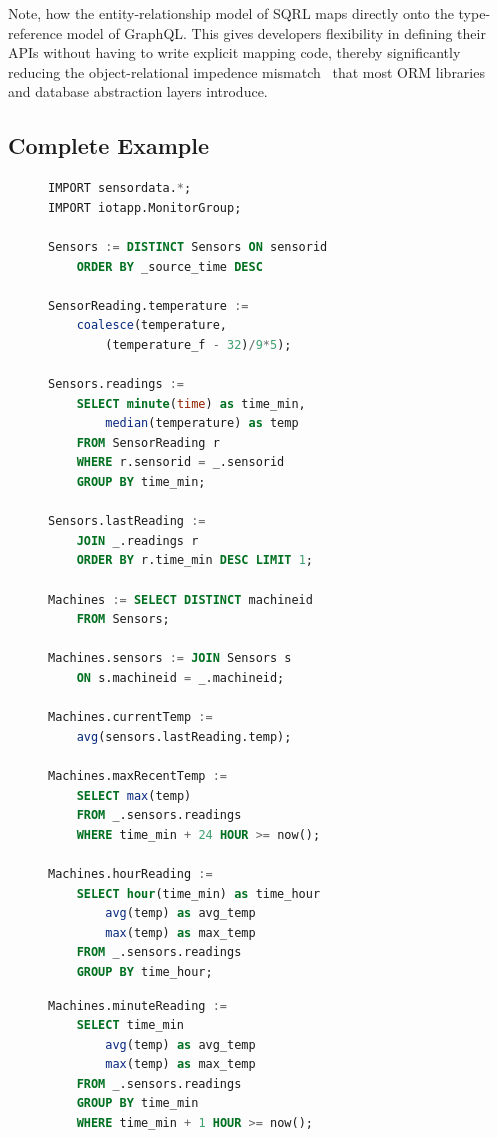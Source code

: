 \documentclass[	DIV=calc,%
							paper=letter,%
							fontsize=11pt,%
							twocolumn]{scrartcl}	 					%
\begin{document}
Note, how the entity-relationship model of SQRL maps directly onto the type-reference model of GraphQL. This gives developers flexibility in defining their APIs without having to write explicit mapping code, thereby significantly reducing the object-relational impedence mismatch~\cite{} that most ORM libraries and database abstraction layers introduce.

\subsection{Complete Example}

\begin{figure}[!ht]
    \begin{minipage}[l]{1.0\columnwidth}
        \centering
        \begin{lstlisting}[language=SQL]
IMPORT sensordata.*;
IMPORT iotapp.MonitorGroup;

Sensors := DISTINCT Sensors ON sensorid
    ORDER BY _source_time DESC

SensorReading.temperature :=
    coalesce(temperature,
        (temperature_f - 32)/9*5);

Sensors.readings :=
    SELECT minute(time) as time_min,
        median(temperature) as temp
    FROM SensorReading r
    WHERE r.sensorid = _.sensorid
    GROUP BY time_min;

Sensors.lastReading :=
    JOIN _.readings r
    ORDER BY r.time_min DESC LIMIT 1;

Machines := SELECT DISTINCT machineid
    FROM Sensors;

Machines.sensors := JOIN Sensors s
    ON s.machineid = _.machineid;

Machines.currentTemp :=
    avg(sensors.lastReading.temp);

Machines.maxRecentTemp :=
    SELECT max(temp)
    FROM _.sensors.readings
    WHERE time_min + 24 HOUR >= now();

Machines.hourReading :=
    SELECT hour(time_min) as time_hour
        avg(temp) as avg_temp
        max(temp) as max_temp
    FROM _.sensors.readings
    GROUP BY time_hour;
    \end{lstlisting}
    \end{minipage}
    \hfill{}
    \begin{minipage}[r][][b]{1.0\columnwidth}
    \centering
    \begin{lstlisting}[language=SQL]
Machines.minuteReading :=
    SELECT time_min
        avg(temp) as avg_temp
        max(temp) as max_temp
    FROM _.sensors.readings
    GROUP BY time_min
    WHERE time_min + 1 HOUR >= now();


\end{lstlisting}
\end{minipage}
\end{figure}
\end{document}
